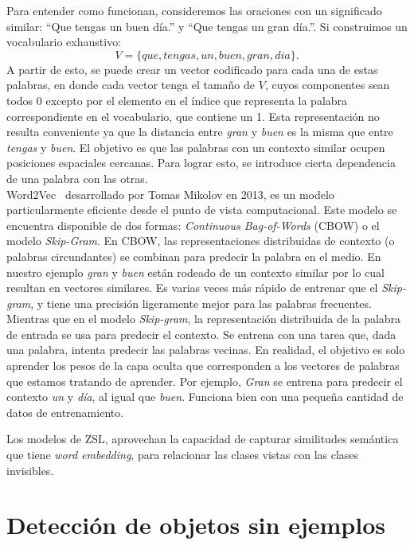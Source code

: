 Para entender como funcionan, consideremos las oraciones con un significado similar: ``Que tengas un buen día.'' y ``Que tengas un gran día.''. Si construimos un vocabulario exhaustivo:
\[ V = \{que, tengas, un, buen, gran, dia\}. \]
A partir de esto, se puede crear un vector codificado para cada una de estas palabras, en donde cada vector tenga el tamaño de $V$, cuyos componentes sean todos 0 excepto por el elemento en el índice que representa la palabra correspondiente en el vocabulario, que contiene un 1. Esta representación no resulta conveniente ya que la distancia entre \textit{gran} y \textit{buen} es la misma que entre \textit{tengas} y \textit{buen}.  El objetivo es que las palabras con un contexto similar ocupen posiciones espaciales cercanas. Para lograr esto, se introduce cierta dependencia de una palabra con las otras.\\

Word2Vec~\cite{mikolov2013distributed} desarrollado por Tomas Mikolov en 2013, es un modelo particularmente eficiente desde el punto de vista computacional. Este modelo se encuentra disponible de dos formas: \textit{Continuous Bag-of-Words} (CBOW) o el modelo \textit{Skip-Gram}. En CBOW, las representaciones distribuidas de contexto (o palabras circundantes) se combinan para predecir la palabra en el medio. En nuestro ejemplo \textit{gran} y \textit{buen} están rodeado de un contexto similar por lo cual resultan en vectores similares. Es varias veces más rápido de entrenar que el \textit{Skip-gram}, y tiene una precisión ligeramente mejor para las palabras frecuentes. Mientras que en el modelo \textit{Skip-gram}, la representación distribuida de la palabra de entrada se usa para predecir el contexto. Se entrena con una tarea que, dada una palabra, intenta predecir las palabras vecinas. En realidad, el objetivo es solo aprender los pesos de la capa oculta que corresponden a los vectores de palabras que estamos tratando de aprender. Por ejemplo, \textit{Gran} se entrena para predecir el contexto \textit{un} y  \textit{día}, al igual que \textit{buen}. Funciona bien con una pequeña cantidad de datos de entrenamiento.

Los modelos de ZSL, aprovechan la capacidad de capturar similitudes semántica que tiene \textit{word embedding}, para relacionar las clases vistas con las clases invisibles.\\


\section{Detección de objetos sin ejemplos} \label{sec:detecciondeobjetossinejemplo}

